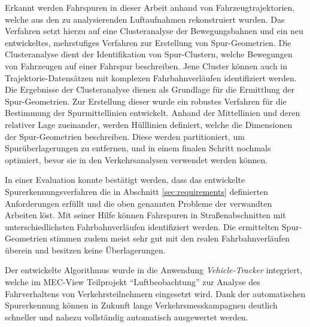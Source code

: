 Erkannt werden Fahrspuren in dieser Arbeit anhand von Fahrzeugtrajektorien, welche aus den zu analysierenden
Luftaufnahmen rekonstruiert wurden. Das Verfahren setzt hierzu auf eine Clusteranalyse der Bewegungsbahnen
und ein neu entwickeltes, mehrstufiges Verfahren zur Erstellung von Spur-Geometrien.
Die Clusteranalyse dient der Identifikation von Spur-Clustern, welche Bewegungen von Fahrzeugen auf einer Fahrspur beschreiben.
Jene Cluster können auch in Trajektorie-Datensätzen mit komplexen Fahrbahnverläufen identifiziert werden.
Die Ergebnisse der Clusteranalyse dienen als Grundlage für die Ermittlung der Spur-Geometrien.
Zur Erstellung dieser wurde ein robustes Verfahren für die Bestimmung der Spurmittellinien entwickelt.
Anhand der Mittellinien und deren relativer Lage zueinander, werden Hülllinien definiert,
welche die Dimensionen der Spur-Geometrien beschreiben. Diese werden partitioniert,
um Spurüberlagerungen zu entfernen, und in einem finalen Schritt nochmals optimiert,
bevor sie in den Verkehrsanalysen verwendet werden können.

In einer Evaluation konnte bestätigt werden, dass das entwickelte Spurerkennungsverfahren die in Abschnitt
\ref{sec:requirements} definierten Anforderungen erfüllt und die oben genannten Probleme der verwandten Arbeiten löst.
Mit seiner Hilfe können Fahrspuren in Straßenabschnitten mit unterschiedlichsten Fahrbahnverläufen identifiziert werden.
Die ermittelten Spur-Geometrien stimmen zudem meist sehr gut mit den realen Fahrbahnverläufen überein
und besitzen keine Überlagerungen.


Der entwickelte Algorithmus wurde in die Anwendung \textit{Vehicle-Tracker} integriert,
welche im MEC-View Teilprojekt ``Luftbeobachtung'' zur Analyse des Fahrverhaltens von Verkehrsteilnehmern
eingesetzt wird. Dank der automatischen Spurerkennung können in Zukunft lange Verkehrsmesskampagnen deutlich
schneller und nahezu vollständig automatisch ausgewertet werden.


